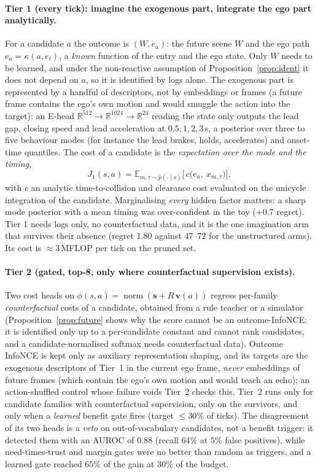 \paragraph{Tier 1 (every tick): imagine the exogenous part, integrate the ego part analytically.}
For a candidate $a$ the outcome is $(W,e_a)$: the future scene $W$ and the ego path $e_a=\kappa(a,e_t)$, a \emph{known} function of the entry and the ego state. Only $W$ needs to be learned, and under the non-reactive assumption of Proposition~\ref{prop:ident} it does not depend on $a$, so it is identified by logs alone. The exogenous part is represented by a handful of descriptors, not by embeddings or frames (a future frame contains the ego's own motion and would smuggle the action into the target):
an E-head $\mathbb R^{512}\!\to\!\mathbb R^{1024}\!\to\!\mathbb R^{24}$ reading the state only outputs the lead gap, closing speed and lead acceleration at $0.5,1,2,3$\,s, a posterior over three to five behaviour modes (for instance the lead brakes, holds, accelerates) and onset-time quantiles. The cost of a candidate is the \emph{expectation over the mode and the timing},
\begin{equation}
J_1(s,a)=\mathbb E_{m,\tau\sim\hat p(\cdot\mid s)}\big[\,c\big(e_a,\ x_{m,\tau}\big)\big],
\end{equation}
with $c$ an analytic time-to-collision and clearance cost evaluated on the unicycle integration of the candidate. Marginalising \emph{every} hidden factor matters: a sharp mode posterior with a mean timing was over-confident in the toy ($+0.7$ regret). Tier 1 needs logs only, no counterfactual data, and it is the one imagination arm that survives their absence (regret $1.80$ against $47$--$72$ for the unstructured arms). Its cost is $\approx3$\,MFLOP per tick on the pruned set.

\paragraph{Tier 2 (gated, top-8, only where counterfactual supervision exists).}
Two cost heads on $\phi(s,a)=\operatorname{norm}(\mathbf s+R\,\mathbf v(a))$ regress per-family \emph{counterfactual} costs of a candidate, obtained from a rule teacher or a simulator (Proposition~\ref{prop:future} shows why the score cannot be an outcome-InfoNCE: it is identified only up to a per-candidate constant and cannot rank candidates, and a candidate-normalised softmax needs counterfactual data). Outcome InfoNCE is kept only as auxiliary representation shaping, and its targets are the exogenous descriptors of Tier~1 in the current ego frame, \emph{never} embeddings of future frames (which contain the ego's own motion and would teach an echo); an action-shuffled control whose failure voids Tier~2 checks this.
Tier~2 runs only for candidate families with counterfactual supervision, only on the survivors, and only when a \emph{learned} benefit gate fires (target $\le30\%$ of ticks). The disagreement of its two heads is a \emph{veto} on out-of-vocabulary candidates, not a benefit trigger: it detected them with an AUROC of $0.88$ (recall $64\%$ at $5\%$ false positives), while need-times-trust and margin gates were no better than random as triggers, and a learned gate reached $65\%$ of the gain at $30\%$ of the budget.

